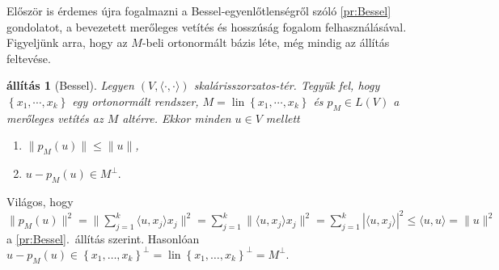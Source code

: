 \documentclass[9pt, a4paper, showtrims]{memoir}
\makeatletter
\renewenvironment{proof}[1][\proofname]
    {\par\pushQED{\qed}%
    \normalfont \topsep6\p@\@plus6\p@\relax
    \trivlist
    \item[\hskip\labelsep
        \itshape
    #1\@addpunct{:}]\ignorespaces}
    {\popQED\endtrivlist\@endpefalse}
\theoremstyle{plain}
\newtheorem{proposition}{állítás}[chapter]
\theoremstyle{remark}
\theoremstyle{definition}
\DeclareMathOperator{\lin}{lin}
\newcommand{\ip}[2]{\langle#1,#2\rangle}
\makeatother
\begin{document}
Először is érdemes újra fogalmazni a Bessel-egyenlőtlenségről szóló \ref{pr:Bessel} gondolatot,
a bevezetett merőleges vetítés és hosszúság fogalom felhasználásával.
Figyeljünk arra, hogy az $M$-beli ortonormált bázis léte, még mindig az állítás feltevése.
\begin{proposition}[Bessel]\label{pr:Bessel2}
	Legyen $\left( V,\ip{\cdot}{\cdot} \right)$ skalárisszorzatos-tér.
	Tegyük fel, hogy $\left\{ x_1,\cdots,x_k \right\}$ egy ortonormált rendszer,
	$M=\lin\left\{ x_1,\cdots,x_k \right\}$
	és $p_M\in L\left( V \right)$ a merőleges vetítés az $M$ altérre.
	Ekkor minden $u\in V$ mellett
	\begin{enumerate}
		\item
		      $\|p_M\left( u \right)\|\leq\|u\|$,
		\item
		      \(
		      u-p_M(u)\in M^\perp.
		      \)
		      \qedhere
	\end{enumerate}
\end{proposition}
\begin{proof}
	Világos, hogy
	$
		\|p_M\left( u \right)\|^2
		=
		\|\sum_{j=1}^k\ip{u}{x_j}x_j\|^2
		=
		\sum_{j=1}^k\|\ip{u}{x_j}x_j\|^2
		=
		\sum_{j=1}^k|\ip{u}{x_j}|^2
		\leq
		\ip{u}{u}
		=
		\|u\|^2
	$
	a \ref{pr:Bessel}.~állítás szerint.
	Hasonlóan
	$
		u-p_M\left( u \right)\in \left\{ x_1,\ldots,x_k \right\}^\perp
		=
		\lin\left\{ x_1,\ldots,x_k \right\}^\perp
		=
		M^\perp.
	$
\end{proof}
\end{document}
